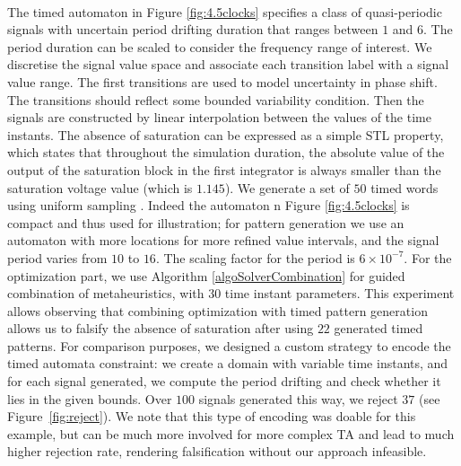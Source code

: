 ~\\
The timed automaton in Figure \ref{fig:4.5clocks} specifies a class of quasi-periodic signals with uncertain period drifting duration that ranges between $1$ and $6$. The period duration can be scaled to consider the frequency range of interest. We discretise the signal value space and associate each transition label with a signal value range. The first transitions are used to model uncertainty in phase shift. The transitions should reflect some bounded variability condition. Then the signals are constructed by linear interpolation between the values of the time instants. The absence of saturation can be expressed as a simple STL property, which states that throughout the simulation duration, the absolute value of the output of the saturation block in the first integrator is always smaller than the saturation voltage value (which is $1.145$). We generate a set of $50$ timed words using uniform sampling \cite{BBBK16}. Indeed the automaton n Figure \ref{fig:4.5clocks} is compact and thus used for illustration; for pattern generation we use an automaton with more locations for more refined value intervals, and the signal period varies from $10$ to $16$. The scaling factor for the period is $6 \times 10^{-7}$. For the optimization part, we use Algorithm \ref{algoSolverCombination} for guided  combination of metaheuristics, with $30$ time instant parameters. This experiment allows observing that combining optimization with timed pattern generation allows us to falsify the absence of saturation after using $22$ generated timed patterns. For comparison purposes, we designed a custom strategy to encode the timed automata constraint: we create a domain with variable time instants, and for each signal generated, we compute the period drifting and check whether it lies in the given bounds. Over $100$ signals generated this way, we reject $37$ (see Figure~\ref{fig:reject}). We note that this type of encoding was doable for this example, but can be much more involved for more complex TA and lead to much higher rejection rate, rendering falsification without our approach infeasible. 
